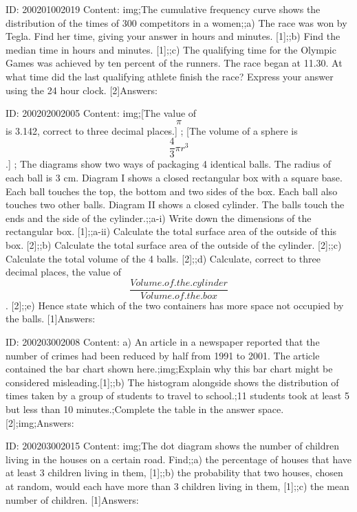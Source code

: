 \documentclass{article}
\begin{document}
ID: 200201002019
Content:
img;The cumulative frequency curve shows the distribution of the times of 300 competitors in a women;;a) The race was won by Tegla. Find her time, giving your answer in hours and minutes. [1];;b) Find the median time in hours and minutes. [1];;c) The qualifying time for the Olympic Games was achieved by ten percent of the runners. The race began at 11.30. At what time did the last qualifying athlete finish the race? Express your answer using the 24 hour clock. [2]Answers:

ID: 200202002005
Content:
img;[The value of $$\pi$$ is 3.142, correct to three decimal places.] ; [The volume of a sphere is $$\frac{4}{3}\pi r^{3} $$.] ; The diagrams show two ways of packaging 4 identical balls. The radius of each ball is 3 cm. Diagram I shows a closed rectangular box with a square base. Each ball touches the top, the bottom and two sides of the box. Each ball also touches two other balls. Diagram II shows a closed cylinder. The balls touch the ends and the side of the cylinder.;;a-i) Write down the dimensions of the rectangular box. [1];;a-ii) Calculate the total surface area of the outside of this box. [2];;b) Calculate the total surface area of the outside of the cylinder. [2];;c) Calculate the total volume of the 4 balls. [2];;d) Calculate, correct to three decimal places, the value of $$\frac{Volume.of.the.cylinder}{Volume.of.the.box}$$ . [2];;e) Hence state which of the two containers has more space not occupied by the balls. [1]Answers:

ID: 200203002008
Content:
a) An article in a newspaper reported that the number of crimes had been reduced by half from 1991 to 2001. The article contained the bar chart shown here.;img;Explain why this bar chart might be considered misleading.[1];;b) The histogram alongside shows the distribution of times taken by a group of students to travel to school.;11 students took at least 5 but less than 10 minutes.;Complete the table in the answer space.   [2];img;Answers:

ID: 200203002015
Content:
img;The dot diagram shows the number of children living in the houses on a certain road. Find;;a) the percentage of houses that have at least 3 children living in them,   [1];;b) the probability that two houses, chosen at random, would each have more than 3 children living in them,   [1];;c) the mean number of children.   [1]Answers:
\end{document}
